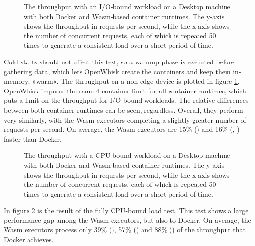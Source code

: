 \begin{figure}
    \begin{center}
        
    \end{center}
    \caption{The throughput with an I/O-bound workload on a Desktop machine with both Docker and Wasm-based container runtimes. The y-axis shows the throughput in requests per second, while the x-axis shows the number of concurrent requests, each of which is repeated 50 times to generate a consistent load over a short period of time.}
    \label{fig:pc-load-block}
\end{figure}


Cold starts should not affect this test, so a warmup phase is executed before gathering data, which lets OpenWhisk create the containers and keep them in-memory; »warm«. The throughput on a non-edge device is plotted in figure \ref{fig:pc-load-block}. OpenWhisk imposes the same 4 container limit for all container runtimes, which puts a limit on the throughput for I/O-bound workloads. The relative differences between both container runtimes can be seen, regardless. Overall, they perform very similarly, with the Wasm executors completing a slightly greater number of requests per second. On average, the Wasm executors are 15\% () and 16\% (, ) faster than Docker.

\begin{figure}
    \begin{center}
        
    \end{center}
    \caption{The throughput with a CPU-bound workload on a Desktop machine with both Docker and Wasm-based container runtimes. The y-axis shows the throughput in requests per second, while the x-axis shows the number of concurrent requests, each of which is repeated 50 times to generate a consistent load over a short period of time.}
    \label{fig:pc-load-hash}
\end{figure}

In figure \ref{fig:pc-load-hash} is the result of the fully CPU-bound load test. This test shows a large performance gap among the Wasm executors, but also to Docker. On average, the Wasm executors process only 39\% (), 57\% () and 88\% () of the throughput that Docker achieves.

